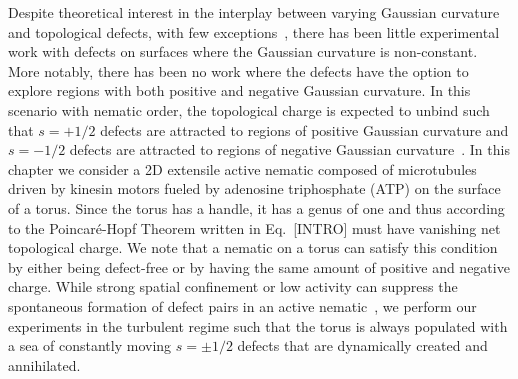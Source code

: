 Despite theoretical interest in the interplay between varying Gaussian curvature and topological defects, with few exceptions~\cite{RN84,RN25,RN73,RN81}, there has been little experimental work with defects on surfaces where the Gaussian curvature is non-constant.
More notably, there has been no work where the defects have the option to explore regions with both positive and negative Gaussian curvature.
In this scenario with nematic order, the topological charge is expected to unbind such that $s = +1/2$ defects are attracted to regions of positive Gaussian curvature and $s=  -1/2$ defects are attracted to regions of negative Gaussian curvature~\cite{RN17,RN19,RN22}.
In this chapter we consider a 2D extensile active nematic composed of microtubules driven by kinesin motors fueled by adenosine triphosphate (ATP) on the surface of a torus.
Since the torus has a handle, it has a genus of one and thus according to the Poincar\'e-Hopf Theorem written in Eq.~[INTRO] must have vanishing net topological charge.
We note that a nematic on a torus can satisfy this condition by either being defect-free or by having the same amount of positive and negative charge.
While strong spatial confinement or low activity can suppress the spontaneous formation of defect pairs in an active nematic~\cite{RN9,RN247}, we perform our experiments in the turbulent regime such that the torus is always populated with a sea of constantly moving $s = \pm 1/2$ defects that are dynamically created and annihilated.\\

